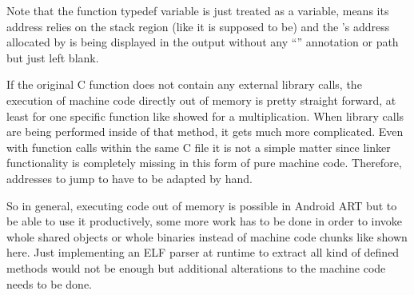 Note that the function typedef variable  is just treated as a variable,
means its address relies on the stack region (like it is supposed to be)
and the 's address allocated by  is being displayed in the  output without any ``'' annotation or path but just left blank.

If the original C function does not contain any external library calls, the execution
of machine code directly out of memory is pretty straight forward, at least for one
specific function like showed for a multiplication. When library calls are being
performed inside of that method, it gets much more complicated. Even with function calls
within the same C file it is not a simple matter since linker functionality is
completely missing in this form of pure machine code. Therefore, addresses to jump to
have to be adapted by hand.

So in general, executing code out of memory is possible in Android ART but to be able
to use it productively, some more work has to be done in order to invoke whole shared
objects or whole binaries instead of machine code chunks like shown here. Just implementing an ELF parser at runtime to extract all kind of defined methods would not be enough but additional alterations to the machine code needs to be done.


